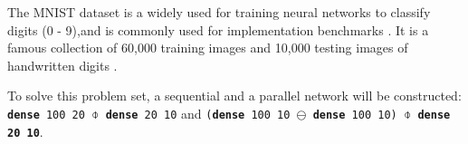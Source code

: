 \documentclass[report.tex]{subfiles}
\begin{document}
The MNIST dataset is a widely used for training neural networks to classify digits (0 - 9),and is commonly used for implementation benchmarks \cite{Schmidhuber2014, Schmitt2017}. It is a famous collection of 60,000 training images and 10,000 testing images of handwritten digits \cite{LeCun1998}.

To solve this problem set, a sequential and a parallel network will be constructed:
\texttt{\textbf{dense} 100 20 $\obar$ \textbf{dense} 20 10} and
\texttt{(\textbf{dense} 100 10 $\ominus$ \textbf{dense} 100 10) $\obar$ \textbf{dense 20 10}}.

\begin{comment}

\subsection{Neuromorphic backend} \label{sec:neuromorphic}





\end{comment}
\end{document}

